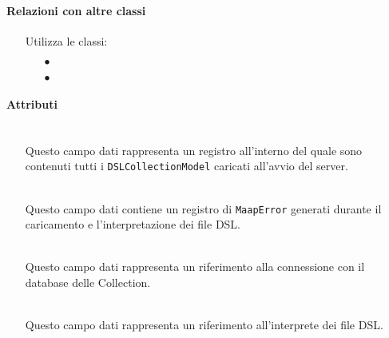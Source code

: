 \paragraph*{Relazioni con altre classi}
\begin{itemize}


\item[] Utilizza le classi:
\begin{itemize}
\item[$\bullet$] 
\item[$\bullet$] 
\end{itemize}
\end{itemize}

\paragraph*{Attributi}
\begin{itemize}
\item[]  \\ Questo campo dati rappresenta un registro all'interno del quale sono contenuti tutti i \texttt{DSLCollectionModel} caricati all'avvio del server.
\item[]  \\ Questo campo dati contiene un registro di \texttt{MaapError} generati durante il caricamento e l'interpretazione dei file DSL.
\item[]  \\ Questo campo dati rappresenta un riferimento alla connessione con il database delle Collection.
\item[]  \\ Questo campo dati rappresenta un riferimento all'interprete dei file DSL.
\end{itemize}

